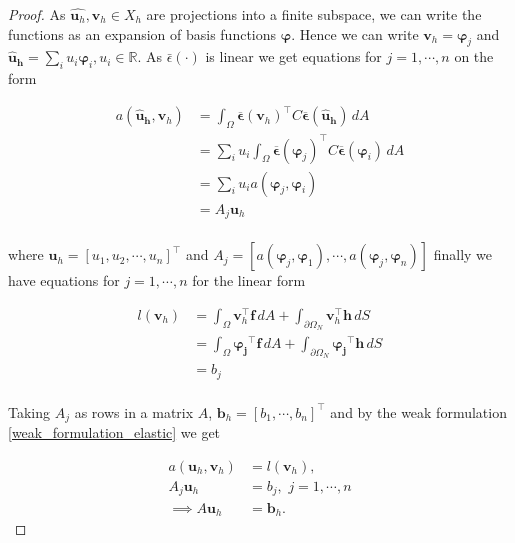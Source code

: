 \documentclass[5pt,a4paper,english]{elsarticle}%
\begin{document}
\begin{proof}
    As $\hat{\bm u_h},\bm v_h \in X_h$ are projections into a finite subspace, we can write the functions as an expansion of basis functions $\bm \varphi$. Hence we can write 
    $\bm v_h = \bm \varphi_j$ and $\bm{ \hat u_h} = \sum_i u_i \bm \varphi_i, u_i \in \mathbb{R}$. As $\bar \epsilon( \cdot )$ is linear we get equations for $j = 1,\cdots,n$ on the form

    \begin{align*}
        a(\bm{ \hat u_h},\bm v_h) &= \int_\Omega{ \boldsymbol{\overline \epsilon}(\bm v_h)^\intercal C\boldsymbol{\overline \epsilon}(\bm{ \hat u_h})} \,dA  \\
        &=\sum_i u_i  \int_\Omega{ \boldsymbol{\overline \epsilon}(\boldsymbol \varphi_j)^\intercal C  \boldsymbol{\overline \epsilon}(\boldsymbol \varphi_i)} \,dA \\
        &= \sum_i u_i a(\bm \varphi_j,\bm \varphi_i) \\
        &= A_j \bm u_h \\
    \end{align*}

    where $\bm u_h = [u_1,u_2,\cdots,u_n]^\intercal$ and $A_j = [a(\bm \varphi_j,\bm \varphi_1),\cdots,a(\bm \varphi_j,\bm \varphi_n)]$ finally we have equations for $j = 1,\cdots,n$ for the linear form

    \begin{align*}
            l(\bm v_h)&= \int_\Omega{\bm v_h^\intercal  \boldsymbol{f}} \,dA + \int_{\partial \Omega_N}{\bm v_h^\intercal \boldsymbol h} \,dS \\
            &= \int_\Omega{\boldsymbol{\varphi_j}^\intercal  \boldsymbol{f}} \,dA + \int_{\partial \Omega_N}{\boldsymbol{\varphi_j}^\intercal \boldsymbol h} \,dS \\
            &= b_j\\
    \end{align*}
    
    Taking $A_j$ as rows in a matrix $A$, $\bm b_h = [b_1,\cdots,b_n]^\intercal$ and by the weak formulation \eqref{weak_formulation_elastic} we get

    \begin{align*}
        a(\bm u_h,\bm v_h) &= l(\bm v_h), \\
        A_j \bm u_h &= b_j, \,\, j = 1,\cdots,n\\
        \implies A\bm u_h &= \bm b_h.
    \end{align*}

\end{proof}
\end{document}
